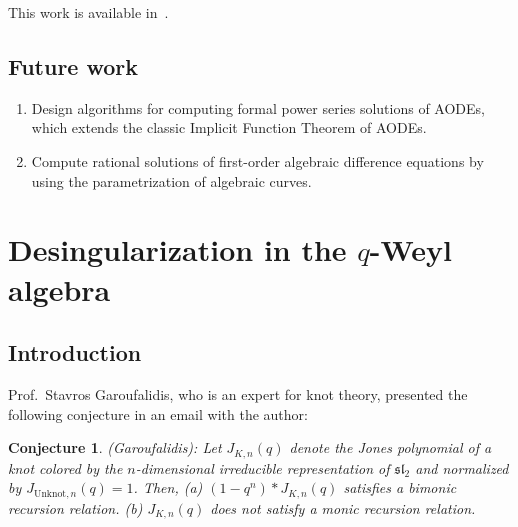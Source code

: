 \documentclass[10pt,a4paper]{article}
\newtheorem{conj}[thm]{Conjecture}
\begin{document}

This work is available in~\cite{VoZhang2017}.

\subsection{Future work}

\begin{enumerate}
 \item Design algorithms for computing formal power series solutions of AODEs, which extends the classic Implicit Function Theorem of AODEs.
 \item Compute rational solutions of first-order algebraic difference equations by using the parametrization of algebraic curves.  
\end{enumerate}


\section{Desingularization in the \texorpdfstring{$q$}{q}-Weyl algebra} \label{SECT:qdesing}

\subsection{Introduction}

Prof.\ Stavros Garoufalidis, who is an expert for knot theory, 
presented the following conjecture in an email with the author:

\begin{conj} \label{CONJ:stavros}
(Garoufalidis): Let $J_{K,n}(q)$ denote the Jones polynomial of a knot colored by the $n$-dimensional irreducible 
representation of $\mathfrak{sl}_2$ and normalized by $J_{\text{Unknot},n}(q)=1$. 
Then, (a) $(1-q^n)*J_{K,n}(q)$ satisfies a bimonic recursion relation. (b) $J_{K,n}(q)$ does not satisfy a monic recursion relation.
\end{conj}
\end{document}
